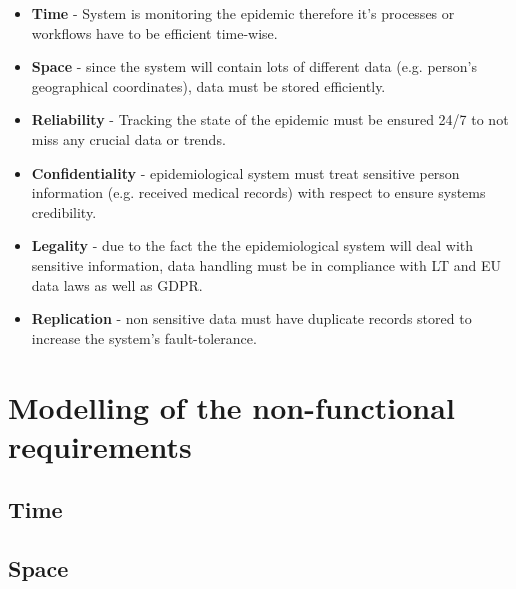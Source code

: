 \documentclass{VUMIFPSkursinis}
\begin{document}
	\begin{itemize}
		\item{\textbf{Time} - System is monitoring the epidemic therefore it's processes or workflows have to be efficient time-wise.}
		\item{\textbf{Space} - since the system will contain lots of different data (e.g. person's geographical coordinates), data must be stored efficiently.}		
		\item{\textbf{Reliability} - Tracking the state of the epidemic must be ensured 24/7 to not miss any crucial data or trends.}
		\item{\textbf{Confidentiality} - epidemiological system must treat sensitive person information (e.g. received medical records) with respect to ensure systems credibility.}
		\item {\textbf{Legality} - due to the fact the the epidemiological system will deal with sensitive information, data handling must be in compliance with LT and EU data laws as well as GDPR.}
		\item{\textbf{Replication} - non sensitive data must have duplicate records stored to increase the system's fault-tolerance.}
	\end{itemize}

\section{Modelling of the non-functional requirements}
	\subsection{Time}
	\subsection{Space}
\end{document}
